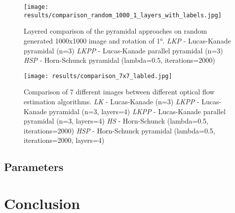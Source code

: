 \documentclass[runningheads]{llncs}
\begin{document}
\begin{figure}[ht!]
    \centering
    \texttt{[image: results/comparison\_random\_1000\_1\_layers\_with\_labels.jpg]}
    \caption{Layered comparison of the pyramidal approaches on random generated 1000x1000 image and rotation of \ang{1}.
    \newline 
    \newline\textit{LKP} - Lucas-Kanade pyramidal (n=3)
    \newline\textit{LKPP} - Lucas-Kanade parallel pyramidal (n=3)
    \newline\textit{HSP} - Horn-Schunck pyramidal (lambda=0.5, iterations=2000)
    \label{img_0}}
\end{figure}

\begin{figure}[ht!]
    \centering
    \texttt{[image: results/comparison\_7x7\_labled.jpg]}
    \caption{Comparison of 7 different images between different optical flow estimation algorithms.
    \newline
    \newline\textit{LK} - Lucas-Kanade (n=3)
    \newline\textit{LKPP} - Lucas-Kanade pyramidal (n=3, layers=4)
    \newline\textit{LKPP} - Lucas-Kanade parallel pyramidal (n=3, layers=4)
    \newline\textit{HS} - Horn-Schunck (lambda=0.5, iterations=2000)
    \newline\textit{HSP} - Horn-Schunck pyramidal (lambda=0.5, iterations=2000, layers=4)
    \label{img_1}}
\end{figure}

\subsection{Parameters}

\section{Conclusion}
\end{document}
